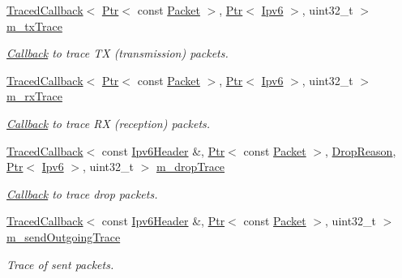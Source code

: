 \begin{DoxyCompactItemize}
\item 
\hyperlink{classns3_1_1TracedCallback}{Traced\+Callback}$<$ \hyperlink{classns3_1_1Ptr}{Ptr}$<$ const \hyperlink{classns3_1_1Packet}{Packet} $>$, \hyperlink{classns3_1_1Ptr}{Ptr}$<$ \hyperlink{classns3_1_1Ipv6}{Ipv6} $>$, uint32\+\_\+t $>$ \hyperlink{classns3_1_1Ipv6L3Protocol_a2037be8528273f3495216a09384e38e7}{m\+\_\+tx\+Trace}
\begin{DoxyCompactList}\small\item\em \hyperlink{classns3_1_1Callback}{Callback} to trace TX (transmission) packets. \end{DoxyCompactList}\item 
\hyperlink{classns3_1_1TracedCallback}{Traced\+Callback}$<$ \hyperlink{classns3_1_1Ptr}{Ptr}$<$ const \hyperlink{classns3_1_1Packet}{Packet} $>$, \hyperlink{classns3_1_1Ptr}{Ptr}$<$ \hyperlink{classns3_1_1Ipv6}{Ipv6} $>$, uint32\+\_\+t $>$ \hyperlink{classns3_1_1Ipv6L3Protocol_a2fc8b57fc958fccd7c708f8c8ca03da5}{m\+\_\+rx\+Trace}
\begin{DoxyCompactList}\small\item\em \hyperlink{classns3_1_1Callback}{Callback} to trace RX (reception) packets. \end{DoxyCompactList}\item 
\hyperlink{classns3_1_1TracedCallback}{Traced\+Callback}$<$ const \hyperlink{classns3_1_1Ipv6Header}{Ipv6\+Header} \&, \hyperlink{classns3_1_1Ptr}{Ptr}$<$ const \hyperlink{classns3_1_1Packet}{Packet} $>$, \hyperlink{classns3_1_1Ipv6L3Protocol_a33c64db9bc35f71ff368b132bfffa37a}{Drop\+Reason}, \hyperlink{classns3_1_1Ptr}{Ptr}$<$ \hyperlink{classns3_1_1Ipv6}{Ipv6} $>$, uint32\+\_\+t $>$ \hyperlink{classns3_1_1Ipv6L3Protocol_ac22d2d63cac436267ae6cafc46880a6e}{m\+\_\+drop\+Trace}
\begin{DoxyCompactList}\small\item\em \hyperlink{classns3_1_1Callback}{Callback} to trace drop packets. \end{DoxyCompactList}\item 
\hyperlink{classns3_1_1TracedCallback}{Traced\+Callback}$<$ const \hyperlink{classns3_1_1Ipv6Header}{Ipv6\+Header} \&, \hyperlink{classns3_1_1Ptr}{Ptr}$<$ const \hyperlink{classns3_1_1Packet}{Packet} $>$, uint32\+\_\+t $>$ \hyperlink{classns3_1_1Ipv6L3Protocol_aac1ff242aa91275202e37cf7d805eec8}{m\+\_\+send\+Outgoing\+Trace}
\begin{DoxyCompactList}\small\item\em Trace of sent packets. \end{DoxyCompactList}\item 

\end{DoxyCompactItemize}
